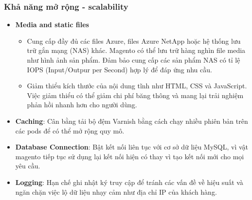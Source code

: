 \subsubsection{Khả năng mở rộng - scalability}
    \begin{itemize}
        \item \textbf{Media and static files}
            \begin{itemize}
                \item Cung cấp đầy đủ các files Azure, files Azure NetApp hoặc hệ thống lưu trữ gắn mạng (NAS) khác. Magento có thể lưu trữ hàng nghìn file media như hình ảnh sản phẩm. Đảm bảo cung cấp các sản phẩm NAS có tỉ lệ IOPS (Input/Outpur per Second) hợp lý để đáp ứng nhu cầu. 
                \item Giảm thiểu kích thước của nội dung tĩnh như HTML, CSS và JavaScript. Việc giảm thiểu có thể giảm chi phí băng thông và mang lại trải nghiệm phản hồi nhanh hơn cho người dùng. 
            \end{itemize}
        \item \textbf{Caching}: Cân bằng tải bộ đệm Varnish bằng cách chạy nhiều phiên bản trên các pods để có thể mở rộng quy mô.
        \item \textbf{Database Connection}: Bật kết nối liên tục với cơ sở dữ liệu MySQL, vì vật magento tiếp tục sử dụng lại kết nối hiện có thay vì tạo kết nối mới cho mọi yêu cầu.
        \item \textbf{Logging}: Hạn chế ghi nhật ký truy cập để tránh các vấn đề về hiệu suất và ngăn chặn việc lộ dữ liệu nhạy cảm như địa chỉ IP của khách hàng.  
    \end{itemize}
